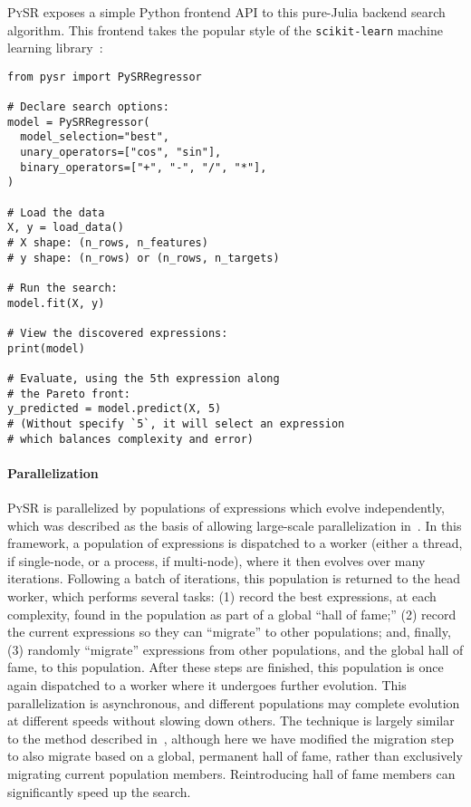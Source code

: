 \documentclass[letterpaper,twocolumn]{scrartcl}
\newcommand\pysr{\textsc{PySR}\xspace}
\begin{document}
\begin{linenumbers}
\pysr exposes a simple Python frontend API to this pure-Julia
backend search algorithm.
This frontend takes the popular style
of the \texttt{scikit-learn} machine learning library~\cite{pedregosaScikitlearnMachineLearning2011b}:
\begin{minipage}{0.95\linewidth}
\begin{verbatim}
from pysr import PySRRegressor

# Declare search options:
model = PySRRegressor(
  model_selection="best",
  unary_operators=["cos", "sin"],
  binary_operators=["+", "-", "/", "*"],
)

# Load the data
X, y = load_data()
# X shape: (n_rows, n_features)
# y shape: (n_rows) or (n_rows, n_targets)

# Run the search:
model.fit(X, y)

# View the discovered expressions:
print(model)

# Evaluate, using the 5th expression along
# the Pareto front:
y_predicted = model.predict(X, 5)
# (Without specify `5`, it will select an expression
# which balances complexity and error)
\end{verbatim}
\end{minipage}

\paragraph{Parallelization}

\pysr is parallelized by populations of expressions which evolve independently, which was described as the basis of allowing large-scale parallelization in~\cite{goldbergComparativeAnalysisSelection1991}.
In this framework, a population of expressions is dispatched to a worker (either a thread, if single-node, or a process, if multi-node), where it then evolves over many iterations.
Following a batch of iterations, this population is returned to the head worker, which performs several tasks:
(1) record the best expressions, at each complexity, found in the population as part of a global ``hall of fame;''
(2) record the current expressions so they can ``migrate'' to other populations; and, finally,
(3) randomly ``migrate'' expressions from other populations, and the global hall of fame, to this population.
After these steps are finished, this population is once again dispatched to a worker where it undergoes further evolution.
This parallelization is asynchronous, and different populations may complete evolution at different speeds without slowing down others.
The technique is largely similar to the method described in~\cite{schmidtDistillingFreeFormNatural2009}, although here we have modified the migration step to also migrate based on a global, permanent hall of fame, rather than exclusively migrating current population members.
Reintroducing hall of fame members can significantly speed up the search.



\end{linenumbers}
\end{document}
